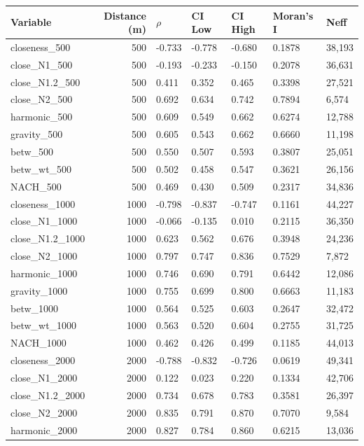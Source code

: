 \begin{tabular}{lrlllll}
\toprule
Variable & Distance (m) & $\rho$ & CI Low & CI High & Moran's I & Neff \\
\midrule
closeness\_500 & 500 & -0.733 & -0.778 & -0.680 & 0.1878 & 38,193 \\
close\_N1\_500 & 500 & -0.193 & -0.233 & -0.150 & 0.2078 & 36,631 \\
close\_N1.2\_500 & 500 & 0.411 & 0.352 & 0.465 & 0.3398 & 27,521 \\
close\_N2\_500 & 500 & 0.692 & 0.634 & 0.742 & 0.7894 & 6,574 \\
harmonic\_500 & 500 & 0.609 & 0.549 & 0.662 & 0.6274 & 12,788 \\
gravity\_500 & 500 & 0.605 & 0.543 & 0.662 & 0.6660 & 11,198 \\
betw\_500 & 500 & 0.550 & 0.507 & 0.593 & 0.3807 & 25,051 \\
betw\_wt\_500 & 500 & 0.502 & 0.458 & 0.547 & 0.3621 & 26,156 \\
NACH\_500 & 500 & 0.469 & 0.430 & 0.509 & 0.2317 & 34,836 \\
closeness\_1000 & 1000 & -0.798 & -0.837 & -0.747 & 0.1161 & 44,227 \\
close\_N1\_1000 & 1000 & -0.066 & -0.135 & 0.010 & 0.2115 & 36,350 \\
close\_N1.2\_1000 & 1000 & 0.623 & 0.562 & 0.676 & 0.3948 & 24,236 \\
close\_N2\_1000 & 1000 & 0.797 & 0.747 & 0.836 & 0.7529 & 7,872 \\
harmonic\_1000 & 1000 & 0.746 & 0.690 & 0.791 & 0.6442 & 12,086 \\
gravity\_1000 & 1000 & 0.755 & 0.699 & 0.800 & 0.6663 & 11,183 \\
betw\_1000 & 1000 & 0.564 & 0.525 & 0.603 & 0.2647 & 32,472 \\
betw\_wt\_1000 & 1000 & 0.563 & 0.520 & 0.604 & 0.2755 & 31,725 \\
NACH\_1000 & 1000 & 0.462 & 0.426 & 0.499 & 0.1185 & 44,013 \\
closeness\_2000 & 2000 & -0.788 & -0.832 & -0.726 & 0.0619 & 49,341 \\
close\_N1\_2000 & 2000 & 0.122 & 0.023 & 0.220 & 0.1334 & 42,706 \\
close\_N1.2\_2000 & 2000 & 0.734 & 0.678 & 0.783 & 0.3581 & 26,397 \\
close\_N2\_2000 & 2000 & 0.835 & 0.791 & 0.870 & 0.7070 & 9,584 \\
harmonic\_2000 & 2000 & 0.827 & 0.784 & 0.860 & 0.6215 & 13,036 \\

\end{tabular}

